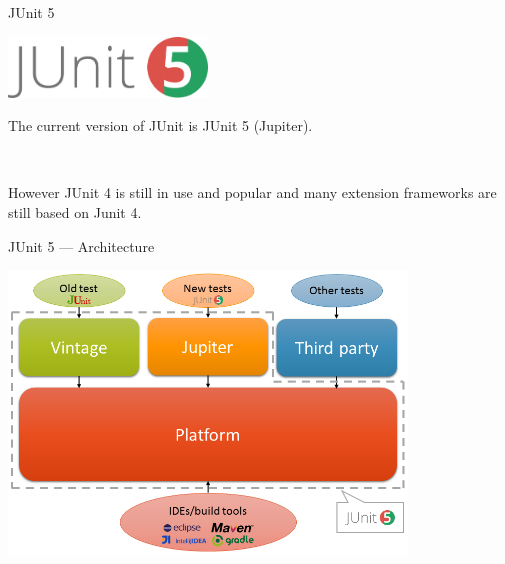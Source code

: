\documentclass[11pt, xcolor=svgnames]{beamer}
\begin{document}

\begin{frame}{JUnit 5}

\begin{center}
  \includegraphics[width=150pt]{./figs/jUnit5Logo}
\end{center}
  
The current version of JUnit is JUnit 5 (Jupiter).

~

However JUnit 4 is still in use and popular and many extension frameworks are still based on Junit 4. 

%

\end{frame}


\begin{frame}{JUnit 5 --- Architecture }

  \begin{center}
    \includegraphics[width=300pt]{./figs/jUnit5Architecture}
  \end{center}
    

  
  
  \end{frame}
\end{document}
